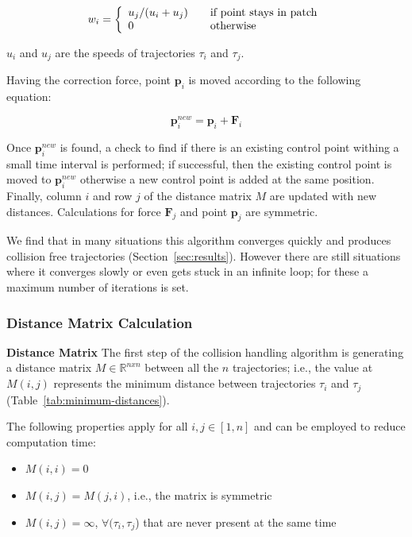 \begin{equation}
w_i = \left\{
	\begin{array}{l l}
		u_j / (u_i + u_j)	&	\quad \text{if point stays in patch}\\
		0					&	\quad \text{otherwise}
	\end{array}
	\right.
\end{equation}

$u_i$ and $u_j$ are the speeds of trajectories $\tau_i$ and $\tau_j$.

Having the correction force, point $\mathbf{p}_i$ is moved according to the following equation:

\begin{equation}
	\mathbf{p}_i^{new} = \mathbf{p}_i + \mathbf{F}_i
\end{equation}


Once $\mathbf{p}_i^{new}$ is found, a check to find if there is an existing control point withing a small time interval is performed; if successful, then the existing control point is moved to $\mathbf{p}_i^{new}$ otherwise a new control point is added at the same position.
Finally, column $i$ and row $j$ of the distance matrix $M$ are updated with new distances.
Calculations for force $\mathbf{F}_j$ and point $\mathbf{p}_j$ are symmetric.

We find that in many situations this algorithm converges quickly and produces collision free trajectories (Section~\ref{sec:results}).
However there are still situations where it converges slowly or even gets stuck in an infinite loop; for these a maximum number of iterations is set.


\subsubsection{Distance Matrix Calculation}
\label{sec:method:remove-collisions:distance-matrix}
\textbf{Distance Matrix} The first step of the collision handling algorithm is generating a distance matrix $M \in \mathbb{R}^{nxn}$ between all the $n$ trajectories; i.e., the value at $M(i, j)$ represents the minimum distance between trajectories $\tau_i$ and $\tau_j$ (Table~{\ref{tab:minimum-distances}}).

The following properties apply for all $i, j \in [1, n]$ and can be employed to reduce computation time:
\begin{itemize}
  \item $M(i, i) = 0$
  \item $M(i, j) = M(j, i)$, i.e., the matrix is symmetric
  \item $M(i, j) = \infty$, \hspace{0.1cm}$\forall (\tau_i, \tau_j$) that are never present at the same time
\end{itemize}

